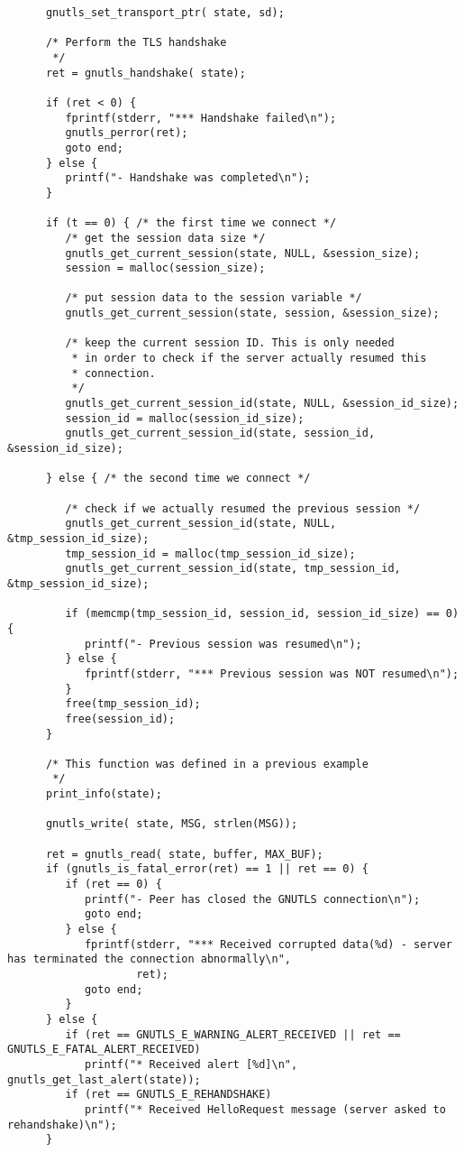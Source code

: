 \begin{verbatim}
      gnutls_set_transport_ptr( state, sd);

      /* Perform the TLS handshake
       */
      ret = gnutls_handshake( state);

      if (ret < 0) {
         fprintf(stderr, "*** Handshake failed\n");
         gnutls_perror(ret);
         goto end;
      } else {
         printf("- Handshake was completed\n");
      }

      if (t == 0) { /* the first time we connect */
         /* get the session data size */
         gnutls_get_current_session(state, NULL, &session_size);
         session = malloc(session_size);

         /* put session data to the session variable */
         gnutls_get_current_session(state, session, &session_size);

         /* keep the current session ID. This is only needed
          * in order to check if the server actually resumed this
          * connection.
          */
         gnutls_get_current_session_id(state, NULL, &session_id_size);
         session_id = malloc(session_id_size);
         gnutls_get_current_session_id(state, session_id, &session_id_size);

      } else { /* the second time we connect */

         /* check if we actually resumed the previous session */
         gnutls_get_current_session_id(state, NULL, &tmp_session_id_size);
         tmp_session_id = malloc(tmp_session_id_size);
         gnutls_get_current_session_id(state, tmp_session_id, &tmp_session_id_size);

         if (memcmp(tmp_session_id, session_id, session_id_size) == 0) {
            printf("- Previous session was resumed\n");
         } else {
            fprintf(stderr, "*** Previous session was NOT resumed\n");
         }
         free(tmp_session_id);
         free(session_id);
      }

      /* This function was defined in a previous example
       */
      print_info(state);

      gnutls_write( state, MSG, strlen(MSG));

      ret = gnutls_read( state, buffer, MAX_BUF);
      if (gnutls_is_fatal_error(ret) == 1 || ret == 0) {
         if (ret == 0) {
            printf("- Peer has closed the GNUTLS connection\n");
            goto end;
         } else {
            fprintf(stderr, "*** Received corrupted data(%d) - server has terminated the connection abnormally\n",
                    ret);
            goto end;
         }
      } else {
         if (ret == GNUTLS_E_WARNING_ALERT_RECEIVED || ret == GNUTLS_E_FATAL_ALERT_RECEIVED)
            printf("* Received alert [%d]\n", gnutls_get_last_alert(state));
         if (ret == GNUTLS_E_REHANDSHAKE)
            printf("* Received HelloRequest message (server asked to rehandshake)\n");
      }


\end{verbatim}
